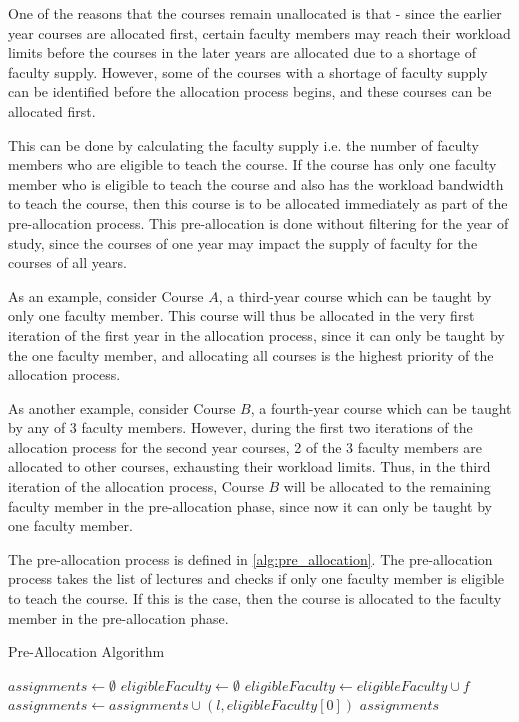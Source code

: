 One of the reasons that the courses remain unallocated is that - since the earlier year courses are allocated first, certain faculty members may reach their workload limits before the courses in the later years are allocated due to a shortage of faculty supply. However, some of the courses with a shortage of faculty supply can be identified before the allocation process begins, and these courses can be allocated first.

This can be done by calculating the faculty supply i.e. the number of faculty members who are eligible to teach the course. If the course has only one faculty member who is eligible to teach the course and also has the workload bandwidth to teach the course, then this course is to be allocated immediately as part of the pre-allocation process. This pre-allocation is done without filtering for the year of study, since the courses of one year may impact the supply of faculty for the courses of all years.

As an example, consider Course $A$, a third-year course which can be taught by only one faculty member. This course will thus be allocated in the very first iteration of the first year in the allocation process, since it can only be taught by the one faculty member, and allocating all courses is the highest priority of the allocation process.

As another example, consider Course $B$, a fourth-year course which can be taught by any of 3 faculty members. However, during the first two iterations of the allocation process for the second year courses, 2 of the 3 faculty members are allocated to other courses, exhausting their workload limits. Thus, in the third iteration of the allocation process, Course $B$ will be allocated to the remaining faculty member in the pre-allocation phase, since now it can only be taught by one faculty member.

The pre-allocation process is defined in \autoref{alg:pre_allocation}. The pre-allocation process takes the list of lectures and checks if only one faculty member is eligible to teach the course. If this is the case, then the course is allocated to the faculty member in the pre-allocation phase.

\begin{algorithm}[H]
  \caption{Pre-Allocation Algorithm}
  \begin{algorithmic}[1]
    \State $assignments \gets \emptyset$
    \State $eligibleFaculty \gets \emptyset$
    \State $eligibleFaculty \gets eligibleFaculty \cup f$
    \EndIf
    \EndFor
    \State $assignments \gets assignments \cup (l, eligibleFaculty[0])$
    \EndIf
    \EndFor
    \State \Return $assignments$
    \EndProcedure
  \end{algorithmic}
  \label{alg:pre_allocation}
\end{algorithm}

